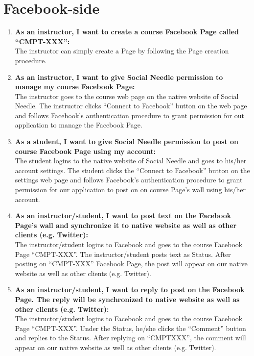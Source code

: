 \section{Facebook-side}

\begin{enumerate}
	\item \textbf{As an instructor, I want to create a course Facebook Page called ``CMPT-XXX'':} \\
	The instructor can simply create a Page by following the Page creation procedure.
	
	\item \textbf{As an instructor, I want to give Social Needle permission to manage my course Facebook Page:} \\
	The instructor goes to the course web page on the native website of Social Needle. The instructor clicks ``Connect to Facebook'' button on the web page and follows Facebook's authentication procedure to grant permission for out application to manage the Facebook Page.
	
	\item \textbf{As a student, I want to give Social Needle permission to post on course Facebook Page using my account:} \\
	 The student logins to the native website of Social Needle and goes to his/her account settings. The student clicks the ``Connect to Facebook'' button on the settings web page and follows Facebook's authentication procedure to grant permission for our application to post on on course Page's wall using his/her account.
	
	\item \textbf{As an instructor/student, I want to post text on the Facebook Page's wall and synchronize it to native website as well as other clients (e.g. Twitter):} \\
	The instructor/student logins to Facebook and goes to the course Facebook Page ``CMPT-XXX''. The instructor/student posts text as Status. After posting on ``CMPT-XXX'' Facebook Page, the post will appear on our native website as well as other clients (e.g. Twitter).
	
	\item \textbf{As an instructor/student, I want to reply to post on the Facebook Page. The reply will be synchronized to native website as well as other clients (e.g. Twitter):} \\
	The instructor/student logins to Facebook and goes to the course Facebook Page ``CMPT-XXX''. Under the Status, he/she clicks the ``Comment'' button and replies to the Status. After replying on ``CMPTXXX'', the comment will appear on our native website as well as other clients (e.g. Twitter).
\end{enumerate}

